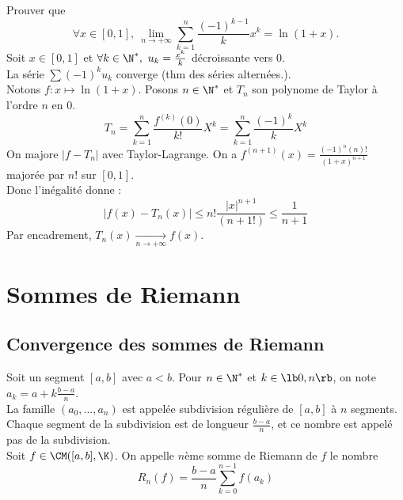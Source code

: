 \documentclass[11pt]{article}
\begin{document}
\begin{ex}{}{}
    Prouver que 
    \begin{equation*}
        \forall x \in [0,1], ~ \lim_{n\to+\infty}\sum_{k=1}^n\frac{(-1)^{k-1}}{k}x^k=\ln(1+x).
    \end{equation*}
    \tcblower
    Soit $x\in[0,1]$ et $\forall k\in\N^*, ~ u_k = \frac{x^k}{k}$ décroissante vers 0.\\
    La série $\sum(-1)^ku_k$ converge (thm des séries alternées.).\\
    Notons $f:x\mapsto\ln(1+x)$. Posons $n\in\N^*$ et $T_n$ son polynome de Taylor à l'ordre $n$ en 0.
    \begin{equation*}
        T_n = \sum_{k=1}^n\frac{f^{(k)}(0)}{k!}X^k=\sum_{k=1}^n\frac{(-1)^k}{k}X^k
    \end{equation*}
    On majore $|f-T_n|$ avec Taylor-Lagrange. On a $f^{(n+1)}(x)=\frac{(-1)^n(n)!}{(1+x)^{n+1}}$ majorée par $n!$ sur $[0,1]$.\\
    Donc l'inégalité donne :
    \begin{equation*}
        |f(x)-T_n(x)|\leq n!\frac{|x|^{n+1}}{(n+1!)}\leq\frac{1}{n+1}
    \end{equation*}
    Par encadrement, $T_n(x)\xrightarrow[n\to+\infty]{} f(x)$.
\end{ex}

\section{Sommes de Riemann}
\subsection{Convergence des sommes de Riemann}

\begin{defi}{}{}
    Soit un segment $[a,b]$ avec $a<b$. Pour $n\in\N^*$ et $k\in\lb0,n\rb$, on note $a_k=a+k\frac{b-a}{n}$.\\
    La famille $(a_0,...,a_n)$ est appelée subdivision régulière de $[a,b]$ à $n$ segments. Chaque segment de la subdivision est de longueur $\frac{b-a}{n}$, et ce nombre est appelé pas de la subdivision.\\
    Soit $f\in\CM([a,b], \K)$. On appelle $n$ème somme de Riemann de $f$ le nombre
    \begin{equation*}
        R_n(f)=\frac{b-a}{n}\sum_{k=0}^{n-1}f(a_k)
    \end{equation*}
\end{defi}
\end{document}
